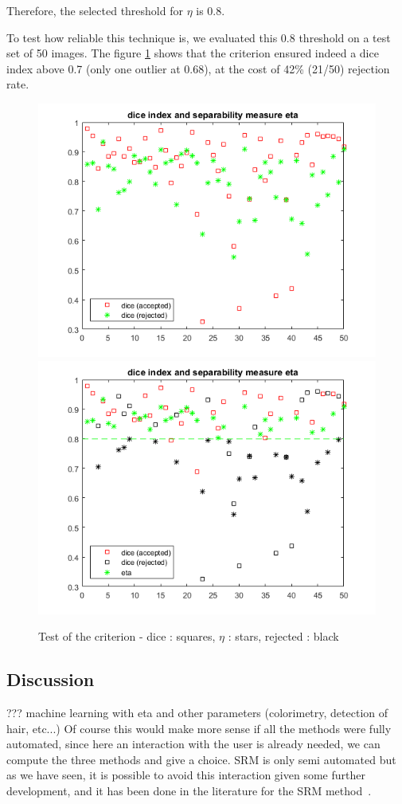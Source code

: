 \documentclass[a4paper,10pt]{article}
\begin{document}
Therefore, the selected threshold for $\eta$ is 0.8.

To test how reliable this technique is, we evaluated this 0.8 threshold on a test set of 50 images. The figure \ref{fig:test-criterion-accepted} shows that the criterion ensured indeed a dice index above 0.7 (only one outlier at 0.68), at the cost of 42\% (21/50) rejection rate.



\begin{figure}[h]
	\centering
	\includegraphics[width=0.6\linewidth]{../results/selection-criterion/test-dice-eta-plot}
	\includegraphics[width=0.6\linewidth]{../results/selection-criterion/test-dice-eta-accepted}
	\caption{Test of the criterion - dice : squares, $\eta$ : stars, rejected : black }
	\label{fig:test-criterion-accepted}
\end{figure}

\subsection{Discussion}
???
machine learning with eta and other parameters (colorimetry, detection of hair, etc...)
Of course this would make more sense if all the methods were fully automated, since here an interaction with the user is already needed, we can compute the three methods and give a choice.
SRM is only semi automated but as we have seen, it is possible to avoid this interaction given some further development, and it has been done in the literature for the SRM method~\cite{celebi_border_2008}. 
\end{document}
